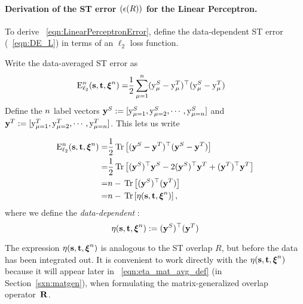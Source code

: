 \paragraph{Derivation of the ST error $(\epsilon(R))$ for the Linear Perceptron.}
To derive \EQN~\ref{eqn:LinearPerceptronError},
define the data-dependent ST error (\EQN~\ref{eqn:DE_L}) in terms of an $\ell_2$ loss function.

Write the data-averaged ST error as
\begin{align}
\nonumber
\mathbf{\mathrm{E}}^{n}_{\ell_2}({\mathbf{s}},{\mathbf{t}}, \boldsymbol{\xi}^{n})= & \frac{1}{2} \sum_{\mu=1}^{n}(\mathrm{y}_{\mu}^{S} - \mathrm{y}_{\mu}^{T})^{\top} (\mathrm{y}_{\mu}^{S} - \mathrm{y}_{\mu}^{T})
\end{align}
Define the $n$ label vectors  
$\mathbf{y}^{S}:=[\mathrm{y}_{\mu=1}^{S}, \mathrm{y}_{\mu=2}^{S}, \cdots, \mathrm{y}_{\mu=n}^{S}]$ and 
$\mathbf{y}^{T}:=[\mathrm{y}_{\mu=1}^{T}, \mathrm{y}_{\mu=2}^{T}, \cdots, \mathrm{y}_{\mu=n}^{T}]$.
This lets us write 

\begin{align}
\nonumber
\mathbf{\mathrm{E}}^{n}_{\ell_2}({\mathbf{s}},{\mathbf{t}}, \boldsymbol{\xi}^{n})= & \frac{1}{2} \mbox{}\operatorname{Tr}\left[(\mathbf{y}^{S} - \mathbf{y}^{T})^{\top} (\mathbf{y}^{S} - \mathbf{y}^{T})\right] \\
\nonumber
=& \frac{1}{2} \mbox{}\operatorname{Tr}\left[(\mathbf{y}^{S})^{\top} \mathbf{y}^{S} - 2 (\mathbf{y}^{S})^{\top} \mathbf{y}^{T} + (\mathbf{y}^{T})^{\top} \mathbf{y}^{T} \right] \\
\nonumber
=& n - \mbox{}\operatorname{Tr}\left[(\mathbf{y}^{S})^{\top} (\mathbf{y}^{T})\right]\\
=& n- \mbox{}\operatorname{Tr}\left[\eta({\mathbf{s}},{\mathbf{t}},\boldsymbol{\xi}^{n})\right],
\label{eqn:deriveSTerror}
\end{align}
where we define the \emph{data-dependent \SelfOverlap}:
\begin{equation}
\eta({\mathbf{s}},{\mathbf{t}},\boldsymbol{\xi}^{n}):=(\mathbf{y}^{S})^{\top}(\mathbf{y}^{T})
\end{equation}

The expression $\eta({\mathbf{s}},{\mathbf{t}},\boldsymbol{\xi}^{n})$ is analogous to the ST overlap $R$, but before the data has been integrated out.
It is convenient to work directly with
the \SelfOverlap $\eta({\mathbf{s}},{\mathbf{t}},\boldsymbol{\xi}^{n})$ because it will appear later in \EQN~\ref{eqn:eta_mat_avg_def} (in Section~\ref{sxn:matgen}), 
when formulating the matrix-generalized overlap operator~$\mathbf{R}$.

